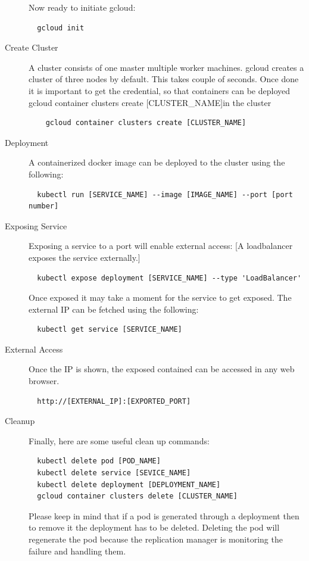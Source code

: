 \begin{description}
Now ready to initiate gcloud:
\begin{verbatim}
  gcloud init
\end{verbatim}

\item[Create Cluster] A cluster consists of one master multiple worker 
machines.  gcloud creates a cluster of three nodes by default. This takes
 couple of  seconds. Once done it is important to get the credential, so that
  containers can be deployed gcloud container clusters create [CLUSTER_NAME]in
   the cluster
  \begin{verbatim}
    gcloud container clusters create [CLUSTER_NAME]
  \end{verbatim}
\item[Deployment] A containerized docker image can be deployed to the cluster 
using the following:
\begin{verbatim}
  kubectl run [SERVICE_NAME] --image [IMAGE_NAME] --port [port number]
\end{verbatim}
\item [Exposing Service] Exposing a service to a port will enable external 
access:
[A loadbalancer exposes the service externally.]
\begin{verbatim}
  kubectl expose deployment [SERVICE_NAME] --type 'LoadBalancer'
\end{verbatim}

Once exposed it may take a moment for the service to get exposed. The external
 IP can be fetched using the following:
\begin{verbatim}
  kubectl get service [SERVICE_NAME]
\end{verbatim}

\item [External Access] Once the IP is shown, the exposed contained can be 
accessed in any web browser.
\begin{verbatim}
  http://[EXTERNAL_IP]:[EXPORTED_PORT]
\end{verbatim}

\item [Cleanup] Finally, here are some useful clean up commands:
\begin{verbatim}
  kubectl delete pod [POD_NAME]
  kubectl delete service [SEVICE_NAME]
  kubectl delete deployment [DEPLOYMENT_NAME]
  gcloud container clusters delete [CLUSTER_NAME]
\end{verbatim}

Please keep in mind that if a pod is generated through a deployment then to 
remove it the deployment has to be deleted. Deleting the pod will regenerate 
the pod because the replication manager is monitoring the failure and handling 
them. 
\end{description}

